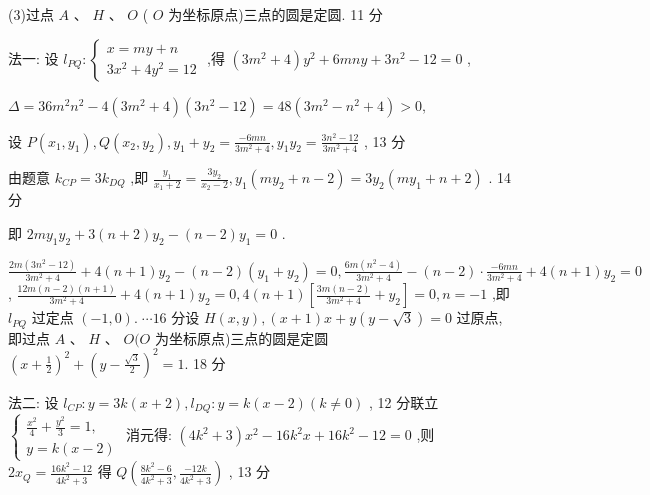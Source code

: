 \documentclass[10pt]{article}
\begin{document}
(3)过点 \(A\) 、 \(H\) 、 \(O\) ( \(O\) 为坐标原点)三点的圆是定圆. 11 分

法一: 设 \({l}_{PQ} : \left\{  \begin{array}{l} x = {my} + n \\  3{x}^{2} + 4{y}^{2} = {12} \end{array}\right.\) ,得 \(\left( {3{m}^{2} + 4}\right) {y}^{2} + {6mny} + 3{n}^{2} - {12} = 0\) ,

\(\Delta  = {36}{m}^{2}{n}^{2} - 4\left( {3{m}^{2} + 4}\right) \left( {3{n}^{2} - {12}}\right)  = {48}\left( {3{m}^{2} - {n}^{2} + 4}\right)  > 0,\)

设 \(P\left( {{x}_{1},{y}_{1}}\right) ,Q\left( {{x}_{2},{y}_{2}}\right) ,{y}_{1} + {y}_{2} = \frac{-{6mn}}{3{m}^{2} + 4},{y}_{1}{y}_{2} = \frac{3{n}^{2} - {12}}{3{m}^{2} + 4}\) , 13 分

由题意 \({k}_{CP} = 3{k}_{DQ}\) ,即 \(\frac{{y}_{1}}{{x}_{1} + 2} = \frac{3{y}_{2}}{{x}_{2} - 2},{y}_{1}\left( {m{y}_{2} + n - 2}\right)  = 3{y}_{2}\left( {m{y}_{1} + n + 2}\right)\) . 14 分

即 \({2m}{y}_{1}{y}_{2} + 3\left( {n + 2}\right) {y}_{2} - \left( {n - 2}\right) {y}_{1} = 0\) .

\(\frac{{2m}\left( {3{n}^{2} - {12}}\right) }{3{m}^{2} + 4} + 4\left( {n + 1}\right) {y}_{2} - \left( {n - 2}\right) \left( {{y}_{1} + {y}_{2}}\right)  = 0,\frac{{6m}\left( {{n}^{2} - 4}\right) }{3{m}^{2} + 4} - \left( {n - 2}\right)  \cdot  \frac{-{6mn}}{3{m}^{2} + 4} + 4\left( {n + 1}\right) {y}_{2} = 0\) , \(\frac{{12m}\left( {n - 2}\right) \left( {n + 1}\right) }{3{m}^{2} + 4} + 4\left( {n + 1}\right) {y}_{2} = 0,4\left( {n + 1}\right) \left\lbrack  {\frac{{3m}\left( {n - 2}\right) }{3{m}^{2} + 4} + {y}_{2}}\right\rbrack   = 0,n =  - 1\) ,即 \({l}_{PQ}\) 过定点 \(\left( {-1,0}\right) .\;\cdots {16}\) 分设 \(H\left( {x,y}\right) ,\left( {x + 1}\right) x + y\left( {y - \sqrt{3}}\right)  = 0\) 过原点,即过点 \(A\text{ 、 }H\text{ 、 }O(O\) 为坐标原点)三点的圆是定圆 \({\left( x + \frac{1}{2}\right) }^{2} + {\left( y - \frac{\sqrt{3}}{2}\right) }^{2} = 1.\) 18 分

法二: 设 \({l}_{CP} : y = {3k}\left( {x + 2}\right) ,{l}_{DQ} : y = k\left( {x - 2}\right) \left( {k \neq  0}\right)\) , 12 分联立 \(\left\{  \begin{array}{l} \frac{{x}^{2}}{4} + \frac{{y}^{2}}{3} = 1, \\  y = k\left( {x - 2}\right)  \end{array}\right.\) 消元得: \(\left( {4{k}^{2} + 3}\right) {x}^{2} - {16}{k}^{2}x + {16}{k}^{2} - {12} = 0\) ,则 \(2{x}_{Q} = \frac{{16}{k}^{2} - {12}}{4{k}^{2} + 3}\) 得 \(Q\left( {\frac{8{k}^{2} - 6}{4{k}^{2} + 3},\frac{-{12k}}{4{k}^{2} + 3}}\right)\) , 13 分
\end{document}

